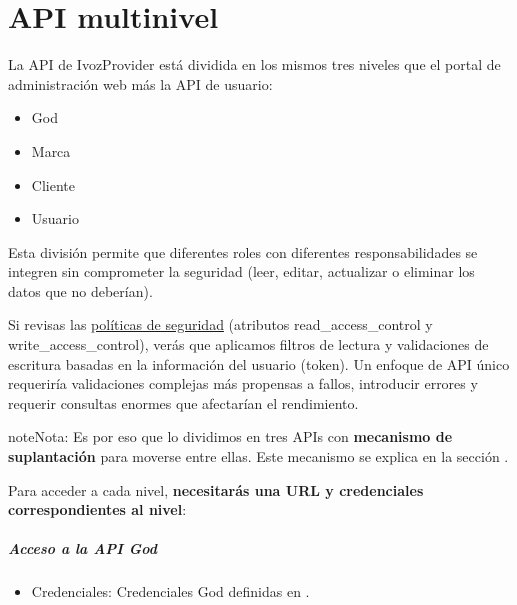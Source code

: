 \documentclass[letterpaper,10pt,spanish]{sphinxmanual}
\begin{document}
\chapter{API multinivel}
\label{api_rest/multilevel::doc}\label{api_rest/multilevel:multi-level-api}
La API de IvozProvider está dividida en los mismos tres niveles que el portal de administración web más la API de usuario:
\begin{itemize}
\item {} 
God

\item {} 
Marca

\item {} 
Cliente

\item {} 
Usuario

\end{itemize}

Esta división permite que diferentes roles con diferentes responsabilidades se integren sin comprometer la seguridad (leer, editar, actualizar o eliminar los datos que no deberían).

Si revisas las \href{https://github.com/irontec/ivozprovider/blob/main/web/rest/brand/config/api/raw/provider.yml}{políticas de seguridad} (atributos read\_access\_control y write\_access\_control), verás que aplicamos filtros de lectura y validaciones de escritura basadas en la información del usuario (token). Un enfoque de API único requeriría validaciones complejas más propensas a fallos, introducir errores y requerir consultas enormes que afectarían el rendimiento.

\begin{notice}{note}{Nota:}
Es por eso que lo dividimos en tres APIs con \textbf{mecanismo de suplantación} para moverse entre ellas. Este mecanismo se explica en la sección {\hyperref[api_rest/use_case:use\string-case]{}}.
\end{notice}

Para acceder a cada nivel, \textbf{necesitarás una URL y credenciales correspondientes al nivel}:
\paragraph{Acceso a la API God}
\begin{itemize}
\item {} 
Credenciales: Credenciales God definidas en {\hyperref[administration_portal/platform/main_operators:main\string-operators]{}}.

\end{itemize}
\end{document}
